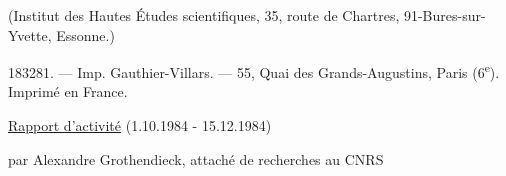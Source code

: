 \documentclass[11pt]{article}
\newcommand{\scanpage}[1]{\par\bigskip\noindent{\small\sffamily[scan #1]}\par}
\newcommand{\mspage}[1]{{\small\sffamily[p.\,#1]}}
\newcommand{\hand}[1]{\textcolor{blue}{#1}}
\newcommand{\uline}[1]{\underline{#1}}
\begin{document}
(Institut
des Hautes Études scientifiques,
35, route de Chartres,
91-Bures-sur-Yvette, Essonne.)

183281. --- Imp. Gauthier-Villars. --- 55, Quai des Grands-Augustins, Paris (6\textsuperscript{e}).
Imprimé en France.

\mspage{\hand{76}}

\clearpage
\scanpage{119/137}
\uline{Rapport d'activité} (1.10.1984 - 15.12.1984)

par Alexandre Grothendieck, attaché de recherches au CNRS
\end{document}
